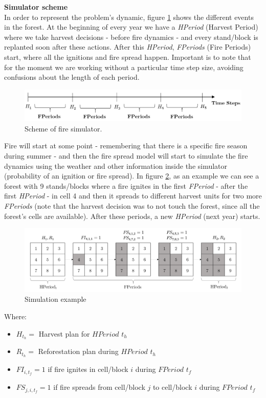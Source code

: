 \documentclass[11pt]{article}
\begin{document}
\textbf{Simulator scheme}\\
In order to represent the problem's dynamic, figure \ref{tline} shows the different events in the forest. At the beginning of every year we have a \textit{HPeriod }(Harvest Period) where we take harvest decisions - before fire dynamics - and every stand/block is replanted soon after these actions. After this \textit{HPeriod}, \textit{FPeriods }(Fire Periods) start, where all the ignitions and fire spread happen. Important is to note that for the moment we are working without a particular time step size, avoiding confusions about the length of each period.

\begin{figure}[h!]
\centering
\includegraphics[scale=0.9]{TimeLine.png}
\caption{\label{tline} Scheme of fire simulator.}	 
\end{figure}

Fire will start at some point - remembering that there is a specific fire season during summer - and then the fire spread model will start to simulate the fire dynamics using the weather and other information inside the simulator (probability of an ignition or fire spread). In figure \ref{Periods}, as an example we can see a forest with 9 stands/blocks where a fire ignites in the first \textit{FPeriod }- after the first \textit{HPeriod }- in cell 4 and then it spreads to different harvest units for two more \textit{FPeriods }(note that the harvest decision was to not touch the forest, since all the forest's cells are available). After these periods, a new \textit{HPeriod }(next year) starts. 

\begin{figure}[h!]
	\centering
	\includegraphics[scale=0.8]{Periods.png}
	\caption{\label{Periods} Simulation example}
\end{figure}
Where:
\begin{itemize}
	\item $H_{t_{h}} = $ Harvest plan for $HPeriod$ $t_{h}$
	\item $R_{t_{h}} = $ Reforestation plan during $HPeriod $ $t_{h}$
	\item $FI_{i,t_{f}} = 1 $ if fire ignites in cell/block $i$ during $ FPeriod $ $t_{f}$
	\item $FS_{j,i,t_{f}} = 1 $ if fire spreads from cell/block $j$ to cell/block $i$ during $ FPeriod $ $t_{f}$
\end{itemize}
\end{document}
